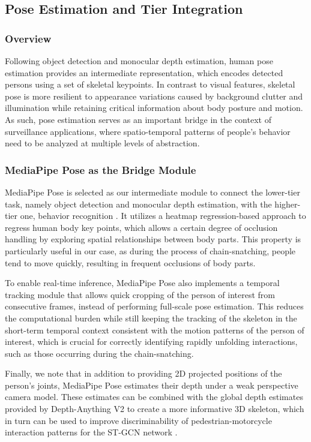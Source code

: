 \documentclass[conference]{IEEEtran}
\begin{document}
\subsection{Pose Estimation and Tier Integration}

\subsubsection{Overview}

Following object detection and monocular depth estimation, human pose estimation provides an intermediate representation, which encodes detected persons using a set of skeletal keypoints. In contrast to visual features, skeletal pose is more resilient to appearance variations caused by background clutter and illumination while retaining critical information about body posture and motion. As such, pose estimation serves as an important bridge in the context of surveillance applications, where spatio-temporal patterns of people’s behavior need to be analyzed at multiple levels of abstraction.

\subsubsection{MediaPipe Pose as the Bridge Module}

MediaPipe Pose is selected as our intermediate module to connect the lower-tier task, namely object detection and monocular depth estimation, with the higher-tier one, behavior recognition \cite{mediapipe}. It utilizes a heatmap regression-based approach to regress human body key points, which allows a certain degree of occlusion handling by exploring spatial relationships between body parts. This property is particularly useful in our case, as during the process of chain-snatching, people tend to move quickly, resulting in frequent occlusions of body parts.

To enable real-time inference, MediaPipe Pose also implements a temporal tracking module that allows quick cropping of the person of interest from consecutive frames, instead of performing full-scale pose estimation. This reduces the computational burden while still keeping the tracking of the skeleton in the short-term temporal context consistent with the motion patterns of the person of interest, which is crucial for correctly identifying rapidly unfolding interactions, such as those occurring during the chain-snatching.

Finally, we note that in addition to providing 2D projected positions of the person’s joints, MediaPipe Pose estimates their depth under a weak perspective camera model. These estimates can be combined with the global depth estimates provided by Depth-Anything V2 \cite{yang2024depth} to create a more informative 3D skeleton, which in turn can be used to improve discriminability of pedestrian-motorcycle interaction patterns for the ST-GCN network \cite{yan2018stgcn}.
\end{document}
